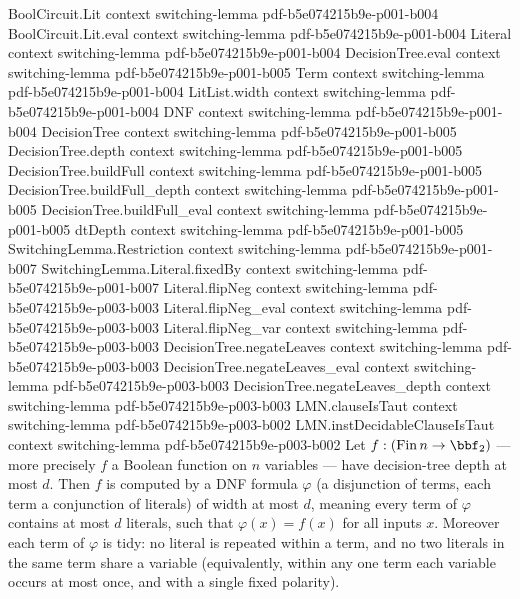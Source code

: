 \begin{theorem}
\label{LMN.dtDepth_le_implies_nice_dnf}
\leanok
{}
\proofstep
  {BoolCircuit.Lit}
  {context}
  {switching-lemma}
  {pdf-b5e074215b9e-p001-b004}
\proofstep
  {BoolCircuit.Lit.eval}
  {context}
  {switching-lemma}
  {pdf-b5e074215b9e-p001-b004}
\proofstep
  {Literal}
  {context}
  {switching-lemma}
  {pdf-b5e074215b9e-p001-b004}
\proofstep
  {DecisionTree.eval}
  {context}
  {switching-lemma}
  {pdf-b5e074215b9e-p001-b005}
\proofstep
  {Term}
  {context}
  {switching-lemma}
  {pdf-b5e074215b9e-p001-b004}
\proofstep
  {LitList.width}
  {context}
  {switching-lemma}
  {pdf-b5e074215b9e-p001-b004}
\proofstep
  {DNF}
  {context}
  {switching-lemma}
  {pdf-b5e074215b9e-p001-b004}
\proofstep
  {DecisionTree}
  {context}
  {switching-lemma}
  {pdf-b5e074215b9e-p001-b005}
\proofstep
  {DecisionTree.depth}
  {context}
  {switching-lemma}
  {pdf-b5e074215b9e-p001-b005}
\proofstep
  {DecisionTree.buildFull}
  {context}
  {switching-lemma}
  {pdf-b5e074215b9e-p001-b005}
\proofstep
  {DecisionTree.buildFull_depth}
  {context}
  {switching-lemma}
  {pdf-b5e074215b9e-p001-b005}
\proofstep
  {DecisionTree.buildFull_eval}
  {context}
  {switching-lemma}
  {pdf-b5e074215b9e-p001-b005}
\proofstep
  {dtDepth}
  {context}
  {switching-lemma}
  {pdf-b5e074215b9e-p001-b005}
\proofstep
  {SwitchingLemma.Restriction}
  {context}
  {switching-lemma}
  {pdf-b5e074215b9e-p001-b007}
\proofstep
  {SwitchingLemma.Literal.fixedBy}
  {context}
  {switching-lemma}
  {pdf-b5e074215b9e-p001-b007}
\proofstep
  {Literal.flipNeg}
  {context}
  {switching-lemma}
  {pdf-b5e074215b9e-p003-b003}
\proofstep
  {Literal.flipNeg_eval}
  {context}
  {switching-lemma}
  {pdf-b5e074215b9e-p003-b003}
\proofstep
  {Literal.flipNeg_var}
  {context}
  {switching-lemma}
  {pdf-b5e074215b9e-p003-b003}
\proofstep
  {DecisionTree.negateLeaves}
  {context}
  {switching-lemma}
  {pdf-b5e074215b9e-p003-b003}
\proofstep
  {DecisionTree.negateLeaves_eval}
  {context}
  {switching-lemma}
  {pdf-b5e074215b9e-p003-b003}
\proofstep
  {DecisionTree.negateLeaves_depth}
  {context}
  {switching-lemma}
  {pdf-b5e074215b9e-p003-b003}
\proofstep
  {LMN.clauseIsTaut}
  {context}
  {switching-lemma}
  {pdf-b5e074215b9e-p003-b002}
\proofstep
  {LMN.instDecidableClauseIsTaut}
  {context}
  {switching-lemma}
  {pdf-b5e074215b9e-p003-b002}
Let $f : (\mathrm{Fin}\,n \to \bbf_2)$ — more precisely $f$ a Boolean function on $n$
variables — have decision-tree depth at most $d$. Then $f$ is computed by a DNF formula
$\varphi$ (a disjunction of terms, each term a conjunction of literals) of width at most
$d$, meaning every term of $\varphi$ contains at most $d$ literals, such that
$\varphi(x) = f(x)$ for all inputs $x$. Moreover each term of $\varphi$ is tidy: no
literal is repeated within a term, and no two literals in the same term share a variable
(equivalently, within any one term each variable occurs at most once, and with a single
fixed polarity).
\end{theorem}

